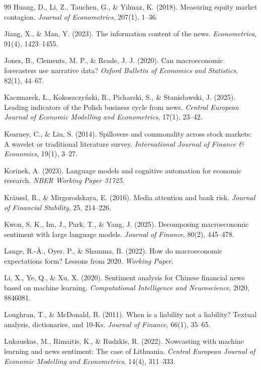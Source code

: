 \documentclass[11pt]{article}
\begin{document}
{{\begin{thebibliography}{99}
 Huang, D., Li, Z., Tauchen, G., \& Yilmaz, K. (2018). Measuring equity market contagion. \textit{Journal of Econometrics}, 207(1), 1--36.

 Jiang, X., \& Man, Y. (2023). The information content of the news. \textit{Econometrica}, 91(4), 1423--1455.

 Jones, B., Clements, M. P., \& Reade, J. J. (2020). Can macroeconomic forecasters use narrative data? \textit{Oxford Bulletin of Economics and Statistics}, 82(1), 44--67.

 Kaczmarek, Ł., Kokoszczyński, R., Picharski, S., \& Stanisławski, J. (2025). Leading indicators of the Polish business cycle from news. \textit{Central European Journal of Economic Modelling and Econometrics}, 17(1), 23--42.

 Kearney, C., \& Liu, S. (2014). Spillovers and commonality across stock markets: A wavelet or traditional literature survey. \textit{International Journal of Finance \& Economics}, 19(1), 3--27.

 Korinek, A. (2023). Language models and cognitive automation for economic research. \textit{NBER Working Paper 31725}.

 Kräussl, R., \& Mirgorodskaya, E. (2016). Media attention and bank risk. \textit{Journal of Financial Stability}, 25, 214--226.

 Kwon, S. K., Im, J., Park, T., \& Yang, J. (2025). Decomposing macroeconomic sentiment with large language models. \textit{Journal of Finance}, 80(2), 445--478.

 Lange, R.-Å., Oyer, P., \& Shamma, B. (2022). How do macroeconomic expectations form? Lessons from 2020. \textit{Working Paper}.

 Li, X., Ye, Q., \& Xu, X. (2020). Sentiment analysis for Chinese financial news based on machine learning. \textit{Computational Intelligence and Neuroscience}, 2020, 8846081.

 Loughran, T., \& McDonald, B. (2011). When is a liability not a liability? Textual analysis, dictionaries, and 10-Ks. \textit{Journal of Finance}, 66(1), 35--65.

 Lukauskas, M., Rimaitis, K., \& Rudzkis, R. (2022). Nowcasting with machine learning and news sentiment: The case of Lithuania. \textit{Central European Journal of Economic Modelling and Econometrics}, 14(4), 311--333.


\end{thebibliography}}}
\end{document}
